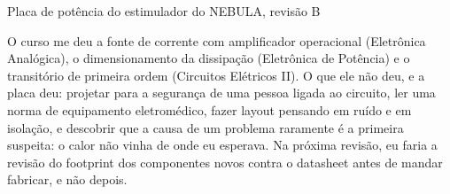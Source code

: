 \begin{atividade}{Placa de potência do estimulador do NEBULA, revisão B}
\begin{aprendizados}
O curso me deu a fonte de corrente com amplificador operacional (Eletrônica Analógica), o
dimensionamento da dissipação (Eletrônica de Potência) e o transitório de primeira ordem (Circuitos
Elétricos II). O que ele não deu, e a placa deu: projetar para a segurança de uma pessoa ligada ao
circuito, ler uma norma de equipamento eletromédico, fazer layout pensando em ruído e em isolação, e
descobrir que a causa de um problema raramente é a primeira suspeita: o calor não vinha de onde eu
esperava. Na próxima revisão, eu faria a revisão do footprint dos componentes novos contra o datasheet
antes de mandar fabricar, e não depois.
\end{aprendizados}
\end{atividade}
